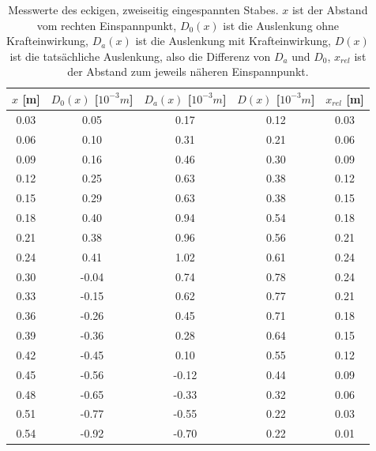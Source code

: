 \documentclass[titlepage = firstcover]{scrartcl}
\begin{document}
        \begin{table}[h]
          \centering
          \caption{Messwerte des eckigen, zweiseitig eingespannten Stabes.
                   $x$ ist der Abstand vom rechten Einspannpunkt,
                   $D_0(x)$ ist die Auslenkung ohne Krafteinwirkung,
                   $D_a(x)$ ist die Auslenkung mit Krafteinwirkung,
                   $D(x)$ ist die tatsächliche Auslenkung, also die Differenz von $D_a$ und $D_0$,
                   $x_{rel}$ ist der Abstand zum jeweils näheren Einspannpunkt.}
          \label{tab:tabEzwei}
          \begin{tabular}{c c c c c}
            \toprule
            {$x$ [m]} & {$D_0(x)$ [$10^{-3}m$]} & {$D_a(x)$ [$10^{-3}m$]} & {$D(x)$ [$10^{-3}m$]} & {$x_{rel}$ [m]}\\
            \midrule
            0.03 &  0.05 &  0.17 & 0.12 & 0.03\\
            0.06 &  0.10 &  0.31 & 0.21 & 0.06\\
            0.09 &  0.16 &  0.46 & 0.30 & 0.09\\
            0.12 &  0.25 &  0.63 & 0.38 & 0.12\\
            0.15 &  0.29 &  0.63 & 0.38 & 0.15\\
            0.18 &  0.40 &  0.94 & 0.54 & 0.18\\
            0.21 &  0.38 &  0.96 & 0.56 & 0.21\\
            0.24 &  0.41 &  1.02 & 0.61 & 0.24\\
            0.30 & -0.04 &  0.74 & 0.78 & 0.24\\
            0.33 & -0.15 &  0.62 & 0.77 & 0.21\\
            0.36 & -0.26 &  0.45 & 0.71 & 0.18\\
            0.39 & -0.36 &  0.28 & 0.64 & 0.15\\
            0.42 & -0.45 &  0.10 & 0.55 & 0.12\\
            0.45 & -0.56 & -0.12 & 0.44 & 0.09\\
            0.48 & -0.65 & -0.33 & 0.32 & 0.06\\
            0.51 & -0.77 & -0.55 & 0.22 & 0.03\\
            0.54 & -0.92 & -0.70 & 0.22 & 0.01\\
            \bottomrule            
          \end{tabular}
        \end{table}
  
\end{document}
